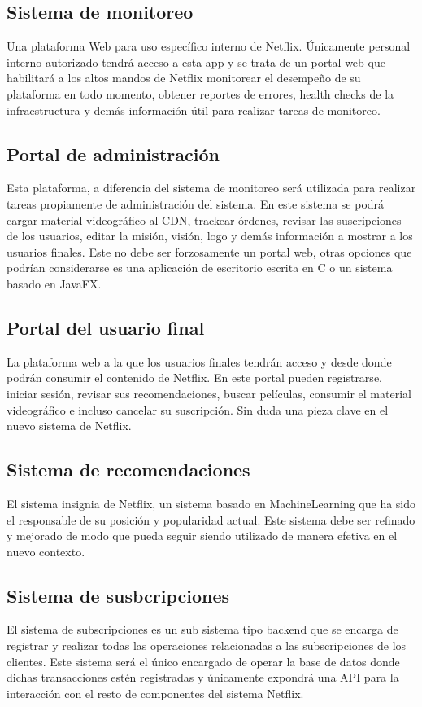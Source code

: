 \documentclass{article}
\begin{document}
\subsection{Sistema de monitoreo}
Una plataforma Web para uso específico interno de Netflix. Únicamente
personal interno autorizado tendrá acceso a esta app y se trata
de un portal web que habilitará a los altos mandos de Netflix 
monitorear el desempeño de su plataforma en todo momento, obtener
reportes de errores, health checks de la infraestructura y demás
información útil para realizar tareas de monitoreo.
\subsection{Portal de administración}
Esta plataforma, a diferencia del sistema de monitoreo será utilizada
para realizar tareas propiamente de administración del sistema. En
este sistema se podrá cargar material videográfico al CDN, trackear
órdenes, revisar las suscripciones de los usuarios, editar la
misión, visión, logo y demás información a mostrar a los usuarios
finales. Este no debe ser forzosamente un portal web, otras
opciones que podrían considerarse es una aplicación de escritorio
escrita en C o un sistema basado en JavaFX.
\subsection{Portal del usuario final}
La plataforma web a la que los usuarios finales tendrán acceso y 
desde donde podrán consumir el contenido de Netflix. En este portal
pueden registrarse, iniciar sesión, revisar sus recomendaciones, 
buscar películas, consumir el material videográfico e incluso
cancelar su suscripción. Sin duda una pieza clave en el nuevo sistema
de Netflix.
\subsection{Sistema de recomendaciones}
El sistema insignia de Netflix, un sistema basado en MachineLearning
que ha sido el responsable de su posición y popularidad actual. Este
sistema debe ser refinado y mejorado de modo que pueda seguir siendo
utilizado de manera efetiva en el nuevo contexto.
\subsection{Sistema de susbcripciones}
El sistema de subscripciones es un sub sistema tipo backend
que se encarga de registrar y realizar todas las operaciones
relacionadas a las subscripciones de los clientes. Este sistema
será el único encargado de operar la base de datos donde dichas
transacciones estén registradas y únicamente expondrá una API
para la interacción con el resto de componentes del sistema Netflix.
\end{document}
